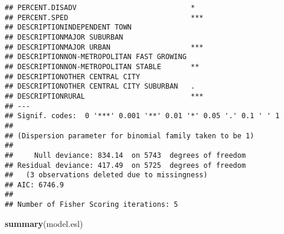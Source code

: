 \documentclass[
]{article}
\newenvironment{Shaded}{\begin{snugshade}}{\end{snugshade}}
\newcommand{\KeywordTok}[1]{\textcolor[rgb]{0.13,0.29,0.53}{\textbf{#1}}}
\newcommand{\NormalTok}[1]{#1}
\begin{document}
\begin{verbatim}
## PERCENT.DISADV                           *  
## PERCENT.SPED                             ***
## DESCRIPTIONINDEPENDENT TOWN                 
## DESCRIPTIONMAJOR SUBURBAN                   
## DESCRIPTIONMAJOR URBAN                   ***
## DESCRIPTIONNON-METROPOLITAN FAST GROWING    
## DESCRIPTIONNON-METROPOLITAN STABLE       ** 
## DESCRIPTIONOTHER CENTRAL CITY               
## DESCRIPTIONOTHER CENTRAL CITY SUBURBAN   .  
## DESCRIPTIONRURAL                         ***
## ---
## Signif. codes:  0 '***' 0.001 '**' 0.01 '*' 0.05 '.' 0.1 ' ' 1
## 
## (Dispersion parameter for binomial family taken to be 1)
## 
##     Null deviance: 834.14  on 5743  degrees of freedom
## Residual deviance: 417.49  on 5725  degrees of freedom
##   (3 observations deleted due to missingness)
## AIC: 6746.9
## 
## Number of Fisher Scoring iterations: 5
\end{verbatim}

\begin{Shaded}
\begin{Highlighting}[]
\KeywordTok{summary}\NormalTok{(model.esl)}
\end{Highlighting}
\end{Shaded}
\end{document}
